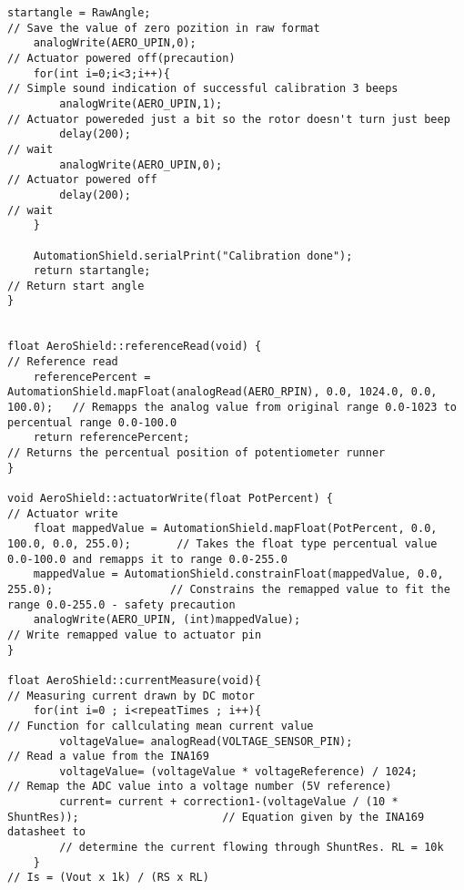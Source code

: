 \begin{lstlisting}[caption={Zdrojový kód súboru AeroShield.cpp.},captionpos=b]
	startangle = RawAngle;                                                // Save the value of zero pozition in raw format 
	analogWrite(AERO_UPIN,0);                                             // Actuator powered off(precaution)
	for(int i=0;i<3;i++){                                               // Simple sound indication of successful calibration 3 beeps
		analogWrite(AERO_UPIN,1);                                         // Actuator powereded just a bit so the rotor doesn't turn just beep 
		delay(200);                                                       // wait 
		analogWrite(AERO_UPIN,0);                                         // Actuator powered off
		delay(200);                                                       // wait 
	}
	
	AutomationShield.serialPrint("Calibration done");
	return startangle;                                                  // Return start angle
}


float AeroShield::referenceRead(void) {                                                  // Reference read
	referencePercent = AutomationShield.mapFloat(analogRead(AERO_RPIN), 0.0, 1024.0, 0.0, 100.0);   // Remapps the analog value from original range 0.0-1023 to percentual range 0.0-100.0
	return referencePercent;                                                                 // Returns the percentual position of potentiometer runner
}

void AeroShield::actuatorWrite(float PotPercent) {                                         // Actuator write
	float mappedValue = AutomationShield.mapFloat(PotPercent, 0.0, 100.0, 0.0, 255.0);       // Takes the float type percentual value 0.0-100.0 and remapps it to range 0.0-255.0
	mappedValue = AutomationShield.constrainFloat(mappedValue, 0.0, 255.0);                  // Constrains the remapped value to fit the range 0.0-255.0 - safety precaution
	analogWrite(AERO_UPIN, (int)mappedValue);                                                // Write remapped value to actuator pin 
}

float AeroShield::currentMeasure(void){                                                    // Measuring current drawn by DC motor 
	for(int i=0 ; i<repeatTimes ; i++){                                                      // Function for callculating mean current value 
		voltageValue= analogRead(VOLTAGE_SENSOR_PIN);                                         // Read a value from the INA169 
		voltageValue= (voltageValue * voltageReference) / 1024;                               // Remap the ADC value into a voltage number (5V reference)
		current= current + correction1-(voltageValue / (10 * ShuntRes));                      // Equation given by the INA169 datasheet to
		// determine the current flowing through ShuntRes. RL = 10k
	}                                                                                     // Is = (Vout x 1k) / (RS x RL)
	

\end{lstlisting}
